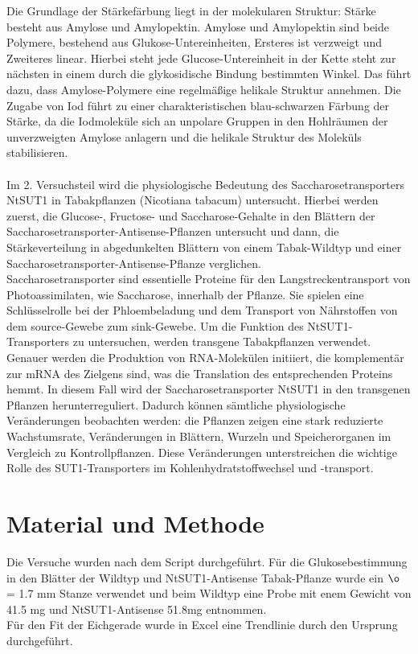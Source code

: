 \documentclass[10pt,a4paper]{article}
\begin{document}
		Die Grundlage der Stärkefärbung liegt in der molekularen Struktur: Stärke besteht aus Amylose und Amylopektin. Amylose und Amylopektin sind beide Polymere, bestehend aus Glukose-Untereinheiten, Ersteres ist verzweigt und Zweiteres linear. Hierbei steht jede Glucose-Untereinheit in der Kette steht zur nächsten in einem durch die glykosidische Bindung bestimmten Winkel. Das führt dazu, dass Amylose-Polymere eine regelmäßige helikale Struktur annehmen. Die Zugabe von Iod führt zu einer charakteristischen blau-schwarzen Färbung der Stärke, da die Iodmoleküle sich an unpolare Gruppen in den Hohlräumen der unverzweigten Amylose anlagern und die helikale Struktur des Moleküls stabilisieren. \\
		\\
		Im 2. Versuchsteil wird die physiologische Bedeutung des Saccharosetransporters NtSUT1 in Tabakpflanzen (Nicotiana tabacum) untersucht. Hierbei werden zuerst, die Glucose-, Fructose- und Saccharose-Gehalte in den Blättern der Saccharosetransporter-Antisense-Pflanzen untersucht und dann, die Stärkeverteilung in abgedunkelten Blättern von einem Tabak-Wildtyp und einer Saccharosetransporter-Antisense-Pflanze verglichen.\\
		Saccharosetransporter sind essentielle Proteine für den Langstreckentransport von Photoassimilaten, wie Saccharose, innerhalb der Pflanze. Sie spielen eine Schlüsselrolle bei der Phloembeladung und dem Transport von Nährstoffen von dem source-Gewebe zum sink-Gewebe. Um die Funktion des NtSUT1-Transporters zu untersuchen, werden transgene Tabakpflanzen verwendet. Genauer werden die Produktion von RNA-Molekülen initiiert, die komplementär zur mRNA des Zielgens sind, was die Translation des entsprechenden Proteins hemmt. In diesem Fall wird der Saccharosetransporter NtSUT1 in den transgenen Pflanzen herunterreguliert. Dadurch können sämtliche physiologische Veränderungen beobachten werden: die Pflanzen zeigen eine stark reduzierte Wachstumsrate, Veränderungen in Blättern, Wurzeln und Speicherorganen im Vergleich zu Kontrollpflanzen. Diese Veränderungen unterstreichen die wichtige Rolle des SUT1-Transporters im Kohlenhydratstoffwechsel und -transport.
	
	\section{Material und Methode}
	Die Versuche wurden nach dem Script durchgeführt.
	Für die Glukosebestimmung in den Blätter der Wildtyp und  NtSUT1-Antisense Tabak-Pflanze wurde ein $\o$ = 1.7 mm Stanze verwendet und beim Wildtyp eine Probe mit enem Gewicht von 41.5 mg und NtSUT1-Antisense 51.8mg entnommen.\\
	Für den Fit der Eichgerade wurde in Excel eine Trendlinie durch den Ursprung durchgeführt.
	
\end{document}
